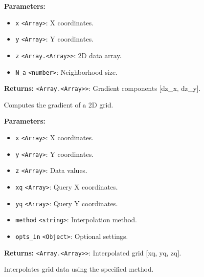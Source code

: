 \documentclass[12pt,a4paper]{article}
\begin{document}
\vspace{5mm}
\noindent {}


\noindent \textbf{Parameters:}
\begin{itemize}
  \item \texttt{x} \texttt{<Array>}: X coordinates.
  \item \texttt{y} \texttt{<Array>}: Y coordinates.
  \item \texttt{z} \texttt{<Array.<Array>>}: 2D data array.
  \item \texttt{N\_a} \texttt{<number>}: Neighborhood size.
\end{itemize}

\noindent \textbf{Returns:} \texttt{<Array.<Array>>}: Gradient components [dz\_x, dz\_y].

\noindent Computes the gradient of a 2D grid.

\vspace{5mm}
\noindent {}


\noindent \textbf{Parameters:}
\begin{itemize}
  \item \texttt{x} \texttt{<Array>}: X coordinates.
  \item \texttt{y} \texttt{<Array>}: Y coordinates.
  \item \texttt{z} \texttt{<Array>}: Data values.
  \item \texttt{xq} \texttt{<Array>}: Query X coordinates.
  \item \texttt{yq} \texttt{<Array>}: Query Y coordinates.
  \item \texttt{method} \texttt{<string>}: Interpolation method.
  \item \texttt{opts\_in} \texttt{<Object>}: Optional settings.
\end{itemize}

\noindent \textbf{Returns:} \texttt{<Array.<Array>>}: Interpolated grid [xq, yq, zq].

\noindent Interpolates grid data using the specified method.

\vspace{5mm}
\noindent {}
\end{document}
